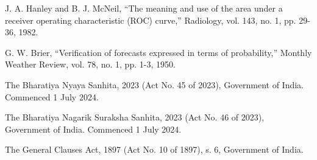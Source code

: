 \documentclass[12pt,a4paper]{article}
\begin{document}
\begin{enumerate}[label={[\arabic*]},leftmargin=2.4em,itemsep=1pt]
  \item J. A. Hanley and B. J. McNeil, ``The meaning and use of the area under a receiver operating characteristic (ROC) curve,'' Radiology, vol. 143, no. 1, pp. 29-36, 1982.
  \item G. W. Brier, ``Verification of forecasts expressed in terms of probability,'' Monthly Weather Review, vol. 78, no. 1, pp. 1-3, 1950.
  \item The Bharatiya Nyaya Sanhita, 2023 (Act No. 45 of 2023), Government of India. Commenced 1 July 2024.
  \item The Bharatiya Nagarik Suraksha Sanhita, 2023 (Act No. 46 of 2023), Government of India. Commenced 1 July 2024.
  \item The General Clauses Act, 1897 (Act No. 10 of 1897), s. 6, Government of India.
\end{enumerate}\endgroup
\end{document}
